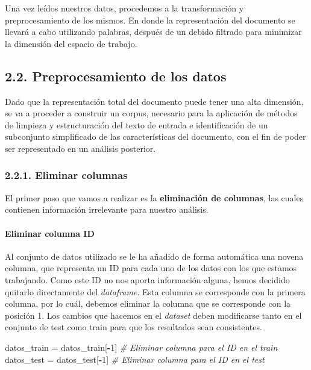 \documentclass[spanish,]{article}
\newenvironment{Shaded}{\begin{snugshade}}{\end{snugshade}}
\newcommand{\DecValTok}[1]{\textcolor[rgb]{0.00,0.00,0.81}{#1}}
\newcommand{\StringTok}[1]{\textcolor[rgb]{0.31,0.60,0.02}{#1}}
\newcommand{\CommentTok}[1]{\textcolor[rgb]{0.56,0.35,0.01}{\textit{#1}}}
\newcommand{\OperatorTok}[1]{\textcolor[rgb]{0.81,0.36,0.00}{\textbf{#1}}}
\newcommand{\NormalTok}[1]{#1}
\let\oldparagraph\paragraph
\renewcommand{\paragraph}[1]{\oldparagraph{#1}\mbox{}}
\begin{document}
Una vez leídos nuestros datos, procedemos a la transformación y
preprocesamiento de los mismos. En donde la representación del documento
se llevará a cabo utilizando palabras, después de un debido filtrado
para minimizar la dimensión del espacio de trabajo.

\subsection{2.2. Preprocesamiento de los
datos}\label{preprocesamiento-de-los-datos}

Dado que la representación total del documento puede tener una alta
dimensión, se va a proceder a construir un corpus, necesario para la
aplicación de métodos de limpieza y estructuración del texto de entrada
e identificación de un subconjunto simplificado de las características
del documento, con el fin de poder ser representado en un análisis
posterior.

\subsubsection{2.2.1. Eliminar columnas}\label{eliminar-columnas}

El primer paso que vamos a realizar es la \textbf{eliminación de
columnas}, las cuales contienen información irrelevante para nuestro
análisis.

\paragraph{Eliminar columna ID}\label{eliminar-columna-id}

Al conjunto de datos utilizado se le ha añadido de forma automática una
novena columna, que representa un ID para cada uno de los datos con los
que estamos trabajando. Como este ID no nos aporta información alguna,
hemos decidido quitarlo directamente del \emph{dataframe}. Esta columna
se corresponde con la primera columna, por lo cuál, debemos eliminar la
columna que se corresponde con la posición 1. Los cambios que hacemos en
el \emph{dataset} deben modificarse tanto en el conjunto de test como
train para que los resultados sean consistentes.

\begin{Shaded}
\begin{Highlighting}[]
\NormalTok{datos_train =}\StringTok{ }\NormalTok{datos_train[}\OperatorTok{-}\DecValTok{1}\NormalTok{] }\CommentTok{# Eliminar columna para el ID en el train}
\NormalTok{datos_test =}\StringTok{ }\NormalTok{datos_test[}\OperatorTok{-}\DecValTok{1}\NormalTok{] }\CommentTok{# Eliminar columna para el ID en el test}
\end{Highlighting}
\end{Shaded}
\end{document}
